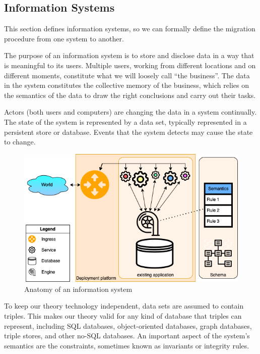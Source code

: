 \documentclass[runningheads]{llncs}
\begin{document}
\subsection{Information Systems}
   This section defines information systems, so we can formally define the migration procedure from one system to another.

   The purpose of an information system is to store and disclose data in a way that is meaningful to its users.
   Multiple users, working from different locations and on different moments, constitute what we will loosely call ``the business''.
   The data in the system constitutes the collective memory of the business,
   which relies on the semantics of the data to draw the right conclusions and carry out their tasks.
   
   Actors (both users and computers) are changing the data in a system continually.
   The state of the system is represented by a data set, typically represented in a persistent store or database.
   Events that the system detects may cause the state to change.
\begin{figure}[bht]
   \begin{center}
     \includegraphics[scale=.45]{figures/datamigration-Pre-migration.png}
   \end{center}
\caption{Anatomy of an information system}
\label{fig:pre-migration}
\end{figure}
   To keep our theory technology independent, data sets are assumed to contain triples.
   This makes our theory valid for any kind of database that triples can represent,
   including SQL databases, object-oriented databases, graph databases, triple stores, and other no-SQL databases.
   An important aspect of the system's semantics are the constraints, sometimes known as invariants or integrity rules.
\end{document}
